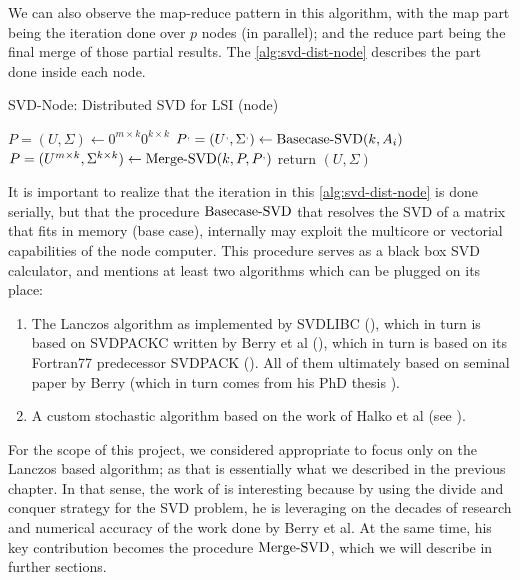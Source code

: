 We can also observe the map-reduce pattern in this algorithm, with the map
part being the iteration done over $p$ nodes (in parallel); and the
reduce part being the final merge of those partial results. The
\cref{alg:svd-dist-node} describes the part done inside each node.

\begin{algorithm}
  \label{alg:svd-dist-node}
  \caption{SVD-Node: Distributed SVD for LSI (node)}
%
  \DontPrintSemicolon
%
%
%
  $P = (U,\Sigma) \gets 0^{m \times k} 0^{k \times k}$ \;
%
  {
    $\prim{P} = (\prim{U},\prim{\Sigma}) \gets \func{Basecase-SVD}(k,A_i)$ \;
%
    $P = (U^{m \times k},\Sigma^{k \times k}) \gets \func{Merge-SVD}(k, P, \prim{P})$ \;
  }
%
  return $(U,\Sigma)$ \;
\end{algorithm}
\hfill

It is important to realize that the iteration in this
\cref{alg:svd-dist-node} is done serially, but that the procedure
$\operatorname{Basecase-SVD}$ that resolves the SVD of a
matrix that fits in memory (base case), internally may exploit the
multicore or vectorial capabilities of the node computer. This
procedure serves as a black box SVD calculator, and \Rehurek mentions
at least two algorithms which can be plugged on its place: \\

\begin{enumerate}
\item The Lanczos algorithm as implemented by SVDLIBC (\cite{svdlibc}),
  which in turn is based on SVDPACKC written by Berry et al
  (\cite{svdpackc}), which in turn is based on its Fortran77
  predecessor SVDPACK (\cite{svdpack}). All of them  ultimately based
  on seminal paper by  Berry \cite{berry92} (which in turn comes from
  his PhD thesis \cite{berry91}). \\
\item A custom stochastic algorithm based on the work of Halko et al
  (see \cite{halko11}).
\end{enumerate}
\hfill

For the scope of this project, we considered appropriate to focus only
on the Lanczos based algorithm; as that is essentially what we
described in the previous chapter. In that sense, the work of \Rehurek
is interesting because by using the divide and conquer strategy for
the SVD problem, he is leveraging on the decades of research and
numerical accuracy of the work done by Berry et al. At the same time,
his key contribution becomes the procedure $\operatorname{Merge-SVD}$, which
we will describe in further sections. \\

